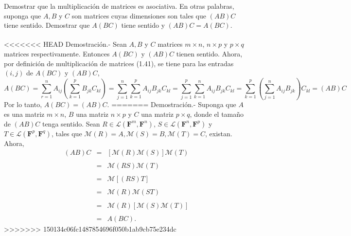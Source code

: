 \begin{lema}
    Demostrar que la multiplicación de matrices es asociativa. En otras palabras, suponga que $A,B$ y $C$ son matrices cuyas dimensiones son tales que $(AB)C$ tiene sentido. Demostrar que $A(BC)$ tiene sentido y $(AB)C=A(BC)$.\\\\
<<<<<<< HEAD
    Demostración.-\; Sean $A,B$ y $C$ matrices $m\times n$, $n\times p$ y $p\times q$ matrices respectivamente. Entonces $A(BC)$ y $(AB)C$ tienen sentido. Ahora, por definición de multiplicación de matrices (1.41), se tiene para las entradas $(i,j)$ de $A(BC)$ y $(AB)C$,
    $$A(BC)=\sum_{r=1}^n A_{ij}\left(\sum_{k=1}^p B_{jk}C_{kl}\right) = \sum_{j=1}^n\sum_{k=1}^p A_{ij}B_{jk}C_{kl} = \displaystyle\sum_{j=1}^p\sum_{k=1}^n A_{ij}B_{jk}C_{kl}=\sum_{k=1}^p\left(\sum_{j=1}^n A_{ij}B_{jk}\right)C_{kl}=(AB)C$$
    Por lo tanto, $A(BC)=(AB)C$.
=======
    Demostración.-\; Suponga que $A$ es una matriz $m\times n$, $B$ una matriz $n\times p$ y $C$ una matriz $p\times q$, donde el tamaño de $(AB)C$ tenga sentido. Sean $R\in \mathcal{L}\left(\textbf{F}^m,\textbf{F}^n\right)$, $S\in \mathcal{L}\left(\textbf{F}^n,\textbf{F}^p\right)$ y $T\in \mathcal{L}\left(\textbf{F}^p,\textbf{F}^q\right)$, tales que $\mathcal{M}(R)=A, \mathcal{M}(S)=B,\mathcal{M}(T)=C$, existan. Ahora,
    $$
    \begin{array}{rcl}
	(AB)C&=& \left[\mathcal{M}(R)\mathcal{M}(S)\right]\mathcal{M}(T)\\\\
	     &=& \mathcal{M}(RS)\mathcal{M}(T)\\\\
	     &=& \mathcal{M}\left[(RS)T\right]\\\\
	     &=& \mathcal{M}(R)\mathcal{M}(ST)\\\\
	     &=& \mathcal{M}(R)\left[\mathcal{M}(S)\mathcal{M}(T)\right]\\\\
	     &=& A(BC).
    \end{array}
    $$
>>>>>>> 150134c06fc1487854696f050b1ab9cb75e234dc
\end{lema}

